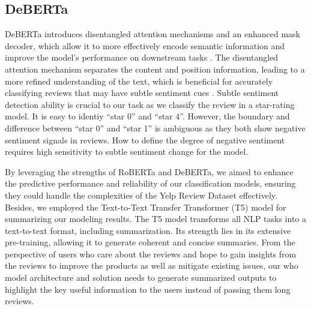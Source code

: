 \documentclass[12pt]{article}
\begin{document}
\subsection{DeBERTa}
DeBERTa introduces disentangled attention mechanisms and an enhanced mask decoder, which allow it to more effectively encode semantic information and improve the model's performance on downstream tasks \citep{he2020deberta}. The disentangled attention mechanism separates the content and position information, leading to a more refined understanding of the text, which is beneficial for accurately classifying reviews that may have subtle sentiment cues \citep{he2020deberta}. Subtle sentiment detection ability is crucial to our task as we classify the review in a star-rating model. It is easy to identiy “star 0” and “star 4”. However, the boundary and difference between “star 0” and “star 1” is ambiguous as they both show negative sentiment signals in reviews. How to define the degree of negative sentiment requires high sensitivity to subtle sentiment change for the model.

By leveraging the strengths of RoBERTa and DeBERTa, we aimed to enhance the predictive performance and reliability of our classification models, ensuring they could handle the complexities of the Yelp Review Dataset effectively. Besides, we employed the Text-to-Text Transfer Transformer (T5) model for summarizing our modeling results. The T5 model transforms all NLP tasks into a text-to-text format, including summarization. Its strength lies in its extensive pre-training, allowing it to generate coherent and concise summaries. From the perspective of users who care about the reviews and hope to gain insights from the reviews to improve the products as well as mitigate existing issues, our who model architecture and solution needs to generate summarized outputs to highlight the key useful information to the users instead of passing them long reviews.
\end{document}

